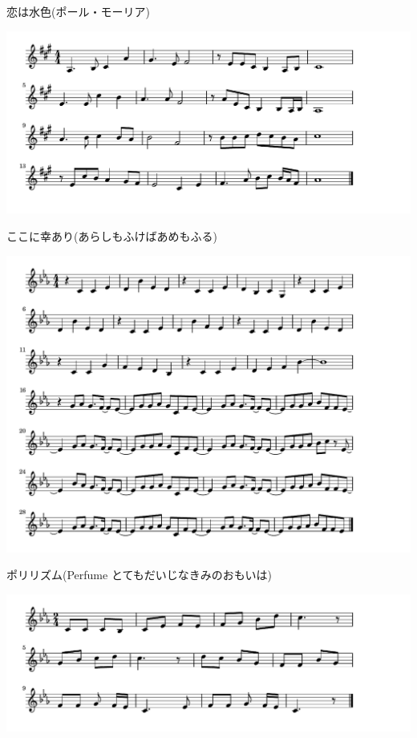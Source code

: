 \documentclass[a4paper]{ltjsarticle}
\begin{document}
\vspace{-10mm} \hspace{10mm}
恋は水色(ポール・モーリア)

\includegraphics[clip]{kokonisachi_crop.pdf}

\vspace{-10mm} \hspace{10mm}
ここに幸あり(あらしもふけばあめもふる)

\includegraphics[clip]{polyrhythm_crop.pdf}

\vspace{-10mm} \hspace{10mm}
ポリリズム(Perfume とてもだいじなきみのおもいは)

\includegraphics[clip]{anomachi_crop.pdf}
\end{document}
